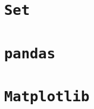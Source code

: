 \documentclass{book}
\begin{document}
\frontmatter
\maketitle
\tableofcontents
\mainmatter
\part{\texttt{Set}}

\part{\texttt{pandas}}
\part{\texttt{Matplotlib}}
\end{document}
